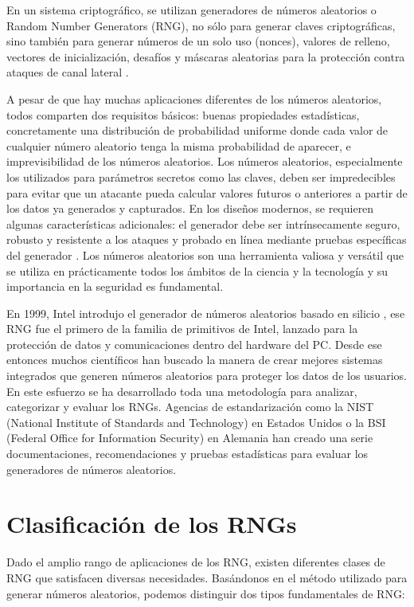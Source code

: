     En un sistema criptográfico, se utilizan generadores de números aleatorios o Random Number Generators (RNG), no sólo para generar claves criptográficas, sino también para generar números de un solo uso (nonces), valores de relleno, vectores de inicialización, desafíos y máscaras aleatorias para la protección contra ataques de canal lateral \cite{Petura2016}.

    A pesar de que hay muchas aplicaciones diferentes de los números aleatorios, todos comparten dos requisitos básicos: buenas propiedades estadísticas, concretamente una distribución de probabilidad uniforme donde cada valor de cualquier número aleatorio tenga la misma probabilidad de aparecer, e imprevisibilidad de los números aleatorios. Los números aleatorios, especialmente los utilizados para parámetros secretos como las claves, deben ser impredecibles para evitar que un atacante pueda calcular valores futuros o anteriores a partir de los datos ya generados y capturados. En los diseños modernos, se requieren algunas características adicionales: el generador debe ser intrínsecamente seguro, robusto y resistente a los ataques y probado en línea mediante pruebas específicas del generador \cite{Badrignans2011}. Los números aleatorios son una herramienta valiosa y versátil que se utiliza en prácticamente todos los ámbitos de la ciencia y la tecnología y su importancia en la seguridad es fundamental.

    En 1999, Intel introdujo el generador de números aleatorios basado en silicio \cite{Jun1999}, ese RNG fue el primero de la familia de primitivos de Intel, lanzado para la protección de datos y comunicaciones dentro del hardware del PC. Desde ese entonces muchos científicos han buscado la manera de crear mejores sistemas integrados que generen números aleatorios para proteger los datos de los usuarios. En este esfuerzo se ha desarrollado toda una metodología para analizar, categorizar y evaluar los RNGs. Agencias de estandarización como la NIST (National Institute of Standards and Technology) \cite{Turan2018} en Estados Unidos o la BSI (Federal Office for Information Security) \cite{AIS2011} en Alemania han creado una serie documentaciones, recomendaciones y pruebas estadísticas para evaluar los generadores de números aleatorios.

 \section{Clasificación de los RNGs}

        Dado el amplio rango de aplicaciones de los RNG, existen diferentes clases de RNG que satisfacen diversas necesidades. Basándonos en el método utilizado para generar números aleatorios, podemos distinguir dos tipos fundamentales de RNG:
	        
